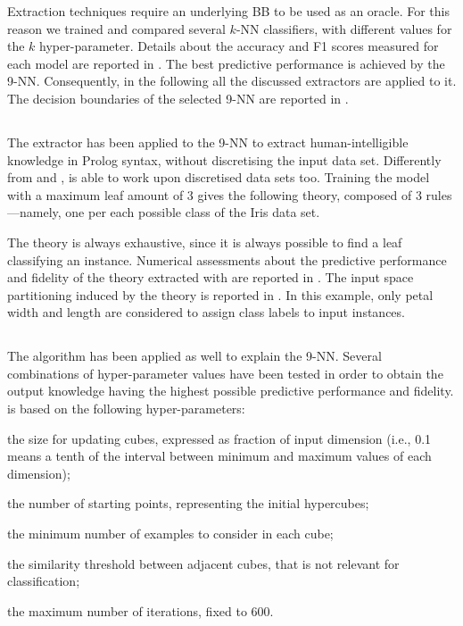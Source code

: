 \documentclass[
]{ceurart}
\begin{document}
Extraction techniques require an underlying BB to be used as an oracle.
%
For this reason we trained and compared several $k$-NN classifiers, with different values for the $k$ hyper-parameter.
%
Details about the accuracy and F1 scores measured for each model are reported in .
%
The best predictive performance is achieved by the 9-NN.
%
Consequently, in the following all the discussed extractors are applied to it.
%
The decision boundaries of the selected 9-NN are reported in .

\subsection{\cart{}}



The \cart{} extractor has been applied to the 9-NN to extract human-intelligible knowledge in Prolog syntax, without discretising the input data set.
%
Differently from \iter{} and \gridex{}, \cart{} is able to work upon discretised data sets too.
%
Training the model with a maximum leaf amount of 3 gives the following theory, composed of 3 rules---namely, one per each possible class of the Iris data set.



The theory is always exhaustive, since it is always possible to find a leaf classifying an instance.
%
Numerical assessments about the predictive performance and fidelity of the theory extracted with \cart{} are reported in .
%
The input space partitioning induced by the theory is reported in .
%
In this example, only petal width and length are considered to assign class labels to input instances.

\subsection{\iter{}}



The \iter{} algorithm has been applied as well to explain the 9-NN.
%
Several combinations of hyper-parameter values have been tested in order to obtain the output knowledge having the highest possible predictive performance and fidelity.
%
\iter{} is based on the following hyper-parameters:
%
\begin{inlinelist}
	\item the size for updating cubes, expressed as fraction of input dimension (i.e., 0.1 means a tenth of the interval between minimum and maximum values of each dimension);
	\item the number of starting points, representing the initial hypercubes;
	\item the minimum number of examples to consider in each cube;
	\item the similarity threshold between adjacent cubes, that is not relevant for classification;
	\item the maximum number of iterations, fixed to 600.
\end{inlinelist}
\end{document}
